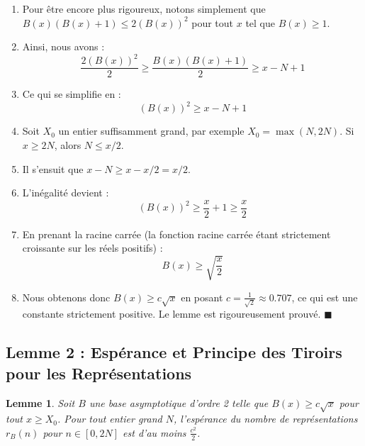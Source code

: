 \documentclass[12pt,a4paper]{article}
\newtheorem{lemma}[theorem]{Lemme}
\begin{document}
\begin{enumerate}
    \item Pour être encore plus rigoureux, notons simplement que $B(x)(B(x) + 1) \le 2 (B(x))^2$ pour tout $x$ tel que $B(x) \ge 1$.
    \item Ainsi, nous avons :
    $$\frac{2(B(x))^2}{2} \ge \frac{B(x)(B(x) + 1)}{2} \ge x - N + 1$$
    \item Ce qui se simplifie en :
    $$(B(x))^2 \ge x - N + 1$$
    \item Soit $X_0$ un entier suffisamment grand, par exemple $X_0 = \max(N, 2N)$. Si $x \ge 2N$, alors $N \le x/2$.
    \item Il s'ensuit que $x - N \ge x - x/2 = x/2$.
    \item L'inégalité devient :
    $$(B(x))^2 \ge \frac{x}{2} + 1 \ge \frac{x}{2}$$
    \item En prenant la racine carrée (la fonction racine carrée étant strictement croissante sur les réels positifs) :
    $$B(x) \ge \sqrt{\frac{x}{2}}$$
    \item Nous obtenons donc $B(x) \ge c \sqrt{x}$ en posant $c = \frac{1}{\sqrt{2}} \approx 0.707$, ce qui est une constante strictement positive. Le lemme est rigoureusement prouvé. $\blacksquare$
\end{enumerate}

\subsection{Lemme 2 : Espérance et Principe des Tiroirs pour les Représentations}
\begin{lemma}
Soit $B$ une base asymptotique d'ordre 2 telle que $B(x) \ge c \sqrt{x}$ pour tout $x \ge X_0$. Pour tout entier grand $N$, l'espérance du nombre de représentations $r_B(n)$ pour $n \in [0, 2N]$ est d'au moins $\frac{c^2}{2}$.
\end{lemma}
\end{document}
